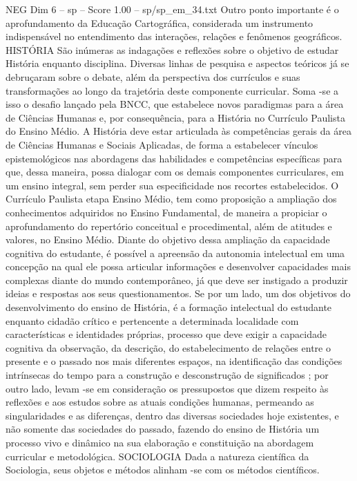 \begin{textsample}{NEG Dim 6 – sp – Score 1.00 – sp/sp\_em\_34.txt}
Outro ponto importante é o aprofundamento da Educação Cartográfica, considerada um instrumento indispensável no entendimento das interações, relações e fenômenos geográficos.
HISTÓRIA São inúmeras as indagações e reflexões sobre o objetivo de estudar História enquanto disciplina.
Diversas linhas de pesquisa e aspectos teóricos já se debruçaram sobre o debate, além da perspectiva dos currículos e suas transformações ao longo da trajetória deste componente curricular.
Soma -se a isso o desafio lançado pela BNCC, que estabelece novos paradigmas para a área de Ciências Humanas e, por consequência, para a História no Currículo Paulista do Ensino Médio.
A História deve estar articulada às competências gerais da área de Ciências Humanas e Sociais Aplicadas, de forma a estabelecer vínculos epistemológicos nas abordagens das habilidades e competências específicas para que, dessa maneira, possa dialogar com os demais componentes curriculares, em um ensino integral, sem perder sua especificidade nos recortes estabelecidos.
O Currículo Paulista etapa Ensino Médio, tem como proposição a ampliação dos conhecimentos adquiridos no Ensino Fundamental, de maneira a propiciar o aprofundamento do repertório conceitual e procedimental, além de atitudes e valores, no Ensino Médio.
Diante do objetivo dessa ampliação da capacidade cognitiva do estudante, é possível a apreensão da autonomia intelectual em uma concepção na qual ele possa articular informações e desenvolver capacidades mais complexas diante do mundo contemporâneo, já que deve ser instigado a produzir ideias e respostas aos seus questionamentos.
Se por um lado, um dos objetivos do desenvolvimento do ensino de História, é a formação intelectual do estudante enquanto cidadão crítico e pertencente a determinada localidade com características e identidades próprias, processo que deve exigir a capacidade cognitiva da observação, da descrição, do estabelecimento de relações entre o presente e o passado nos mais diferentes espaços, na identificação das condições intrínsecas do tempo para a construção e desconstrução de significados ; por outro lado, levam -se em consideração os pressupostos que dizem respeito às reflexões e aos estudos sobre as atuais condições humanas, permeando as singularidades e as diferenças, dentro das diversas sociedades hoje existentes, e não somente das sociedades do passado, fazendo do ensino de História um processo vivo e dinâmico na sua elaboração e constituição na abordagem curricular e metodológica.
SOCIOLOGIA Dada a natureza científica da Sociologia, seus objetos e métodos alinham -se com os métodos científicos.

\end{textsample}
